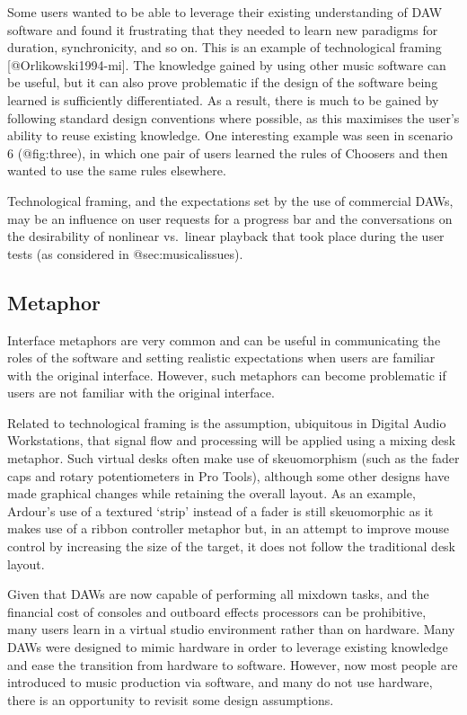 \documentclass[]{article}
\begin{document}
Some users wanted to be able to leverage their existing understanding of
DAW software and found it frustrating that they needed to learn new
paradigms for duration, synchronicity, and so on. This is an example of
technological framing {[}@Orlikowski1994-mi{]}. The knowledge gained by
using other music software can be useful, but it can also prove
problematic if the design of the software being learned is sufficiently
differentiated. As a result, there is much to be gained by following
standard design conventions where possible, as this maximises the user's
ability to reuse existing knowledge. One interesting example was seen in
scenario 6 (@fig:three), in which one pair of users learned the rules of
Choosers and then wanted to use the same rules elsewhere.

Technological framing, and the expectations set by the use of commercial
DAWs, may be an influence on user requests for a progress bar and the
conversations on the desirability of nonlinear vs.~linear playback that
took place during the user tests (as considered in @sec:musicalissues).

\hypertarget{metaphor}{%
\subsection{Metaphor}\label{metaphor}}

Interface metaphors are very common and can be useful in communicating
the roles of the software and setting realistic expectations when users
are familiar with the original interface. However, such metaphors can
become problematic if users are not familiar with the original
interface.

Related to technological framing is the assumption, ubiquitous in
Digital Audio Workstations, that signal flow and processing will be
applied using a mixing desk metaphor. Such virtual desks often make use
of skeuomorphism (such as the fader caps and rotary potentiometers in
Pro Tools), although some other designs have made graphical changes
while retaining the overall layout. As an example, Ardour's use of a
textured `strip' instead of a fader is still skeuomorphic as it makes
use of a ribbon controller metaphor but, in an attempt to improve mouse
control by increasing the size of the target, it does not follow the
traditional desk layout.

Given that DAWs are now capable of performing all mixdown tasks, and the
financial cost of consoles and outboard effects processors can be
prohibitive, many users learn in a virtual studio environment rather
than on hardware. Many DAWs were designed to mimic hardware in order to
leverage existing knowledge and ease the transition from hardware to
software. However, now most people are introduced to music production
via software, and many do not use hardware, there is an opportunity to
revisit some design assumptions.
\end{document}
